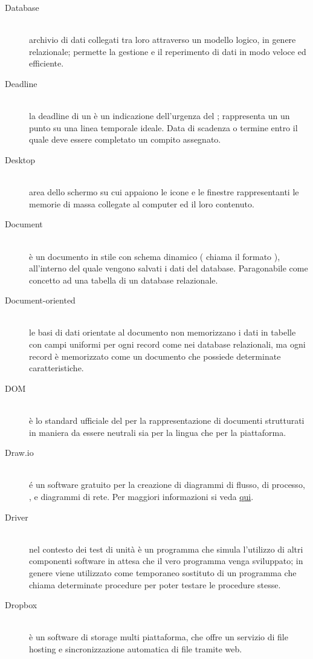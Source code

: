 \documentclass[12pt,a4paper]{article}
\begin{document}
\begin{description}
\item[Database] 
\hfill\\ archivio di dati collegati tra loro attraverso un modello logico, in genere relazionale; permette la gestione e il reperimento di dati in modo veloce ed efficiente.

\item[Deadline] 
\hfill\\ la deadline di un  è un indicazione dell'urgenza del ; rappresenta un un punto su una linea temporale ideale. Data di scadenza o termine entro il quale deve essere completato un compito assegnato.

\item[Desktop] 
\hfill\\ area dello schermo su cui appaiono le icone e le finestre rappresentanti le memorie di massa collegate al computer ed il loro contenuto.

\item[Document] 
\hfill\\è un documento in stile  con schema dinamico ( chiama il formato ), all'interno del quale vengono salvati i dati del database. Paragonabile come concetto ad una tabella di un database relazionale.

\item[Document-oriented] 
\hfill\\ le basi di dati orientate al documento non memorizzano i dati in tabelle con campi uniformi per ogni record come nei database relazionali, ma ogni record è memorizzato come un documento che possiede determinate caratteristiche.

\item[DOM] 
\hfill\\ è lo standard ufficiale del  per la rappresentazione di documenti strutturati in maniera da essere neutrali sia per la lingua che per la piattaforma.

\item[Draw.io] 
\hfill\\ é un software gratuito per la creazione di diagrammi di flusso, di processo, , e diagrammi di rete. Per maggiori informazioni si veda \href{https://www.draw.io}{qui}.

\item[Driver] 
\hfill\\ nel contesto dei test di unità è un programma che simula l'utilizzo di altri componenti software in attesa che il vero programma venga sviluppato; in genere viene utilizzato come temporaneo sostituto di un programma che chiama determinate procedure per poter testare le procedure stesse.

\item[Dropbox] 
\hfill\\ è un software di  storage multi piattaforma, che offre un servizio di file hosting e sincronizzazione automatica di file tramite web.
\end{description}
\end{document}
